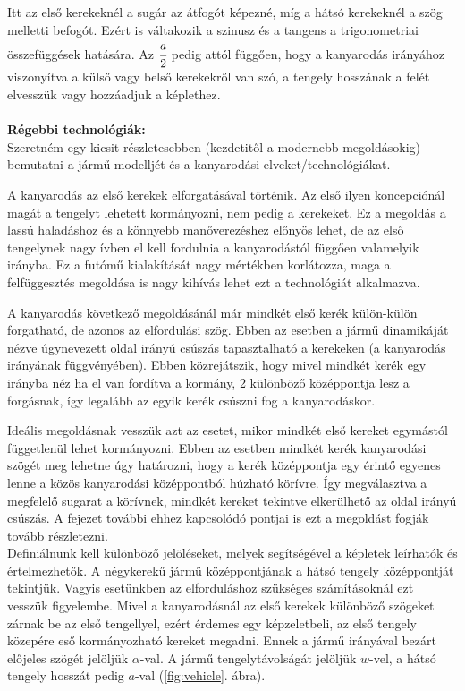 Itt az első kerekeknél a sugár az átfogót képezné, míg a hátsó kerekeknél a szög melletti befogót. Ezért is váltakozik a szinusz és a tangens a trigonometriai összefüggések hatására. Az $\cfrac{a}{2}$ pedig attól függően, hogy a kanyarodás irányához viszonyítva a külső vagy belső kerekekről van szó, a tengely hosszának a felét elvesszük vagy hozzáadjuk a képlethez.\\\\ 
\textbf{Régebbi technológiák:}\\

Szeretném egy kicsit részletesebben (kezdetitől a modernebb megoldásokig) bemutatni a jármű modelljét és a kanyarodási elveket/technológiákat. 

A kanyarodás az első kerekek elforgatásával történik. Az első ilyen koncepciónál magát a tengelyt lehetett kormányozni, nem pedig a kerekeket. Ez a megoldás a lassú haladáshoz és a könnyebb manőverezéshez előnyös lehet, de az első tengelynek nagy ívben el kell fordulnia a kanyarodástól függően valamelyik irányba. Ez a futómű kialakítását nagy mértékben korlátozza, maga a felfüggesztés megoldása is nagy kihívás lehet ezt a technológiát alkalmazva.

A kanyarodás következő megoldásánál már mindkét első kerék külön-külön forgatható, de azonos az elfordulási szög. Ebben az esetben a jármű dinamikáját nézve úgynevezett oldal irányú csúszás tapasztalható a kerekeken (a kanyarodás irányának függvényében). Ebben közrejátszik, hogy mivel mindkét kerék egy irányba néz ha el van fordítva a kormány, 2 különböző középpontja lesz a forgásnak, így legalább az egyik kerék csúszni fog a kanyarodáskor.

Ideális megoldásnak vesszük azt az esetet, mikor mindkét első kereket egymástól függetlenül lehet kormányozni. Ebben az esetben mindkét kerék kanyarodási szögét meg lehetne úgy határozni, hogy a kerék középpontja egy érintő egyenes lenne a közös kanyarodási középpontból húzható körívre. Így megválasztva a megfelelő sugarat a körívnek, mindkét kereket tekintve elkerülhető az oldal irányú csúszás. A fejezet további ehhez kapcsolódó pontjai is ezt a megoldást fogják tovább részletezni.\\

Definiálnunk kell különböző jelöléseket, melyek segítségével a képletek leírhatók és értelmezhetők. A négykerekű jármű középpontjának a hátsó tengely középpontját tekintjük. Vagyis esetünkben az elforduláshoz szükséges számításoknál ezt vesszük figyelembe. Mivel a kanyarodásnál az első kerekek különböző szögeket zárnak be az első tengellyel, ezért érdemes egy képzeletbeli, az első tengely közepére eső kormányozható kereket megadni. Ennek a jármű irányával bezárt előjeles szögét jelöljük $\alpha$-val. A jármű tengelytávolságát jelöljük $w$-vel, a hátsó tengely hosszát pedig $a$-val (\ref{fig:vehicle}. ábra).

